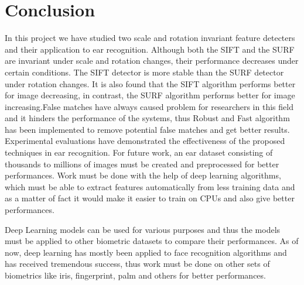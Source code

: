 \chapter{Conclusion} \label{sec:conc} In this project we have studied two scale and rotation invariant feature detecters and their application to ear recognition. Although both the SIFT and the SURF are invariant under scale and rotation changes, their performance decreases under certain conditions. The SIFT detector is more stable than the SURF detector under rotation changes. It is also found that the SIFT algorithm performs better for image decreasing, in contrast, the SURF algorithm performs better for image increasing.False matches have always caused problem for researchers in this field and it hinders the performance of the systems, thus Robust and Fast algorithm has been implemented to remove potential false matches and get better results. Experimental evaluations have demonstrated the effectiveness of the proposed techniques in ear recognition. For future work, an ear dataset consisting of thousands to millions of images must be created and preprocessed for better performances. Work must be done with the help of deep learning algorithms, which must be able to extract features automatically from less training data and as a matter of fact it would make it easier to train on CPUs and also give better performances.

Deep Learning models can be used for various purposes and thus the models must be applied to other biometric datasets to compare their performances. As of now, deep learning has mostly been applied to face recognition algorithms and has received tremendous success, thus work must be done on other sets of biometrics like iris, fingerprint, palm and others for better performances.



